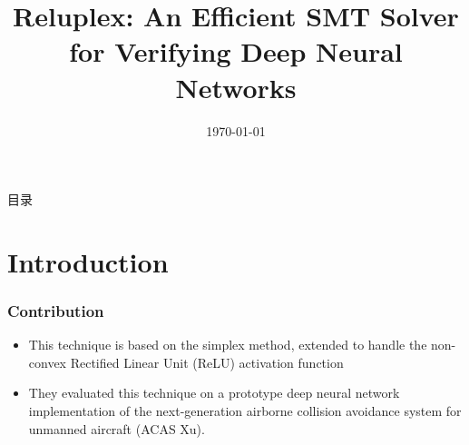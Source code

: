\documentclass[aspectratio=169%
,serif,mathserif]{beamer}
\begin{document}
\title{Reluplex: An Efficient SMT Solver for Verifying Deep Neural Networks} %
\institute[ISCAS] %
{	
}
	\CTEXoptions[today=old]
	\date{\today} %
\begin{frame}[plain]\vspace{1.5em}
\titlepage\vspace{-0.5cm}
\end{frame}
\begin{frame}{目录}
\tableofcontents
\end{frame}

\section{Introduction} %
\begin{frame}
	\frametitle{Contribution}
	\begin{itemize}
		\item This technique is based on the simplex method, extended to handle the non-convex Rectified Linear Unit (ReLU) activation function
		\item They evaluated this technique on a prototype deep neural network implementation of the next-generation airborne collision avoidance system for unmanned aircraft (ACAS Xu).		
	\end{itemize}

\end{frame}
\end{document}
